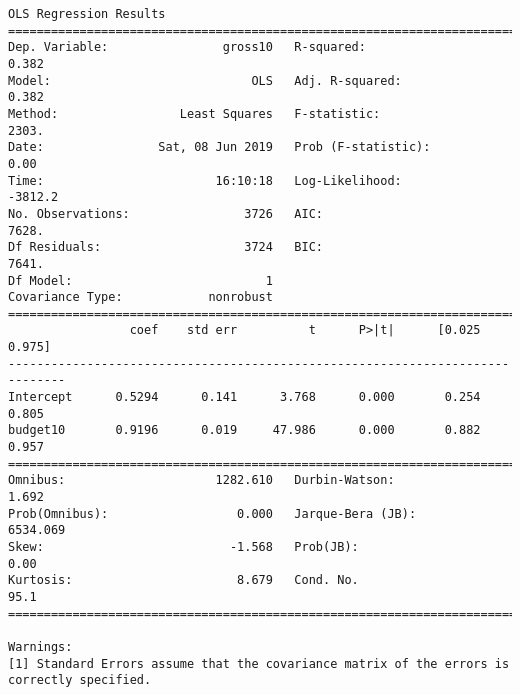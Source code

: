 \documentclass[11pt]{article}
\begin{document}
    \begin{Verbatim}[commandchars=\\\{\}]
                            OLS Regression Results                            
==============================================================================
Dep. Variable:                gross10   R-squared:                       0.382
Model:                            OLS   Adj. R-squared:                  0.382
Method:                 Least Squares   F-statistic:                     2303.
Date:                Sat, 08 Jun 2019   Prob (F-statistic):               0.00
Time:                        16:10:18   Log-Likelihood:                -3812.2
No. Observations:                3726   AIC:                             7628.
Df Residuals:                    3724   BIC:                             7641.
Df Model:                           1                                         
Covariance Type:            nonrobust                                         
==============================================================================
                 coef    std err          t      P>|t|      [0.025      0.975]
------------------------------------------------------------------------------
Intercept      0.5294      0.141      3.768      0.000       0.254       0.805
budget10       0.9196      0.019     47.986      0.000       0.882       0.957
==============================================================================
Omnibus:                     1282.610   Durbin-Watson:                   1.692
Prob(Omnibus):                  0.000   Jarque-Bera (JB):             6534.069
Skew:                          -1.568   Prob(JB):                         0.00
Kurtosis:                       8.679   Cond. No.                         95.1
==============================================================================

Warnings:
[1] Standard Errors assume that the covariance matrix of the errors is correctly specified.

    \end{Verbatim}
\end{document}
